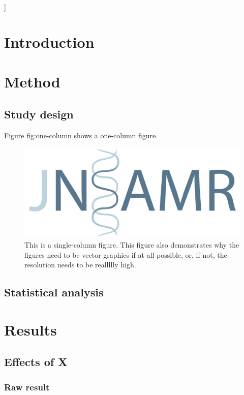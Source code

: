 \documentclass[paper=a4,fontsize=11pt,twocolumn]{article}
\begin{document}
\vspace{8mm}
] %


\section{Introduction}
\lipsum[1-7]

\section{Method}
\subsection{Study design}
Figure fig:one-column shows a one-column figure.

\begin{figure}
\centering
\includegraphics[width=\columnwidth]{logo-long-jnsamr.pdf}
\caption{This is a single-column figure. This figure also demonstrates why the figures need to be vector graphics if at all possible, or, if not, the resolution needs to be reallllly high.}
\label{fig:one-column}
\end{figure}

\lipsum[8-9]

\subsection{Statistical analysis}
\lipsum[10-11]

\section{Results}
\subsection{Effects of X}
\subsubsection{Raw result}
\end{document}
